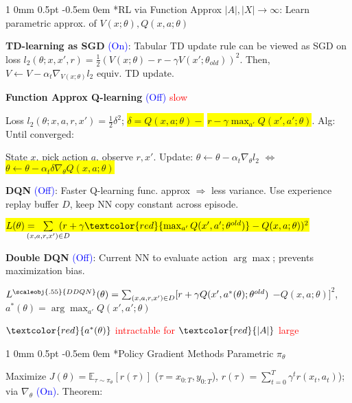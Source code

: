 \documentclass[11pt,landscape,a4paper,fleqn]{article}
\makeatletter
\newcommand*{\rsection}{%
	\@startsection{section}%
	{1}%
	{0mm}%
	{0.5pt}%
	{-0.5em \@plus 0em}
	{\color{myorange}\sffamily\small\bfseries}}
\newcommand{\mhl}[1]{\setlength{\fboxsep}{0pt}\colorbox{yellow}{#1}}
\makeatother
\begin{document}
\begin{multicols*}{4}

		\rsection*{RL via Function Approx} $|A|, |X| \rightarrow \infty$: Learn parametric approx. of  $V(x; \theta), Q(x,a;\theta)$

		\textbf{TD-learning as SGD} {\fontsize{9}{6}\selectfont \textcolor{blue}{(On)}}:
		Tabular TD update rule can be viewed as SGD on loss
	$l_2(\theta; x, x', r) = \frac{1}{2}(V(x;\theta) - r - \gamma V(x'; \theta_{old}))^2$. Then, $V \leftarrow V - \alpha_t \nabla_{V(x;\theta)} l_2$ equiv. TD update.

		\textbf{Function Approx Q-learning} {\fontsize{9}{6}\selectfont \textcolor{blue}{(Off)}} \textcolor{red}{slow}

		Loss $l_2(\theta;x,a,r,x') = \frac{1}{2}\delta^2$;
		\mhl{$\delta = Q(x,a;\theta) - $} \mhl{$ r - \gamma \max_{a'}Q(x',a';\theta)$}. Alg: Until converged:

		State $x$, pick action $a$, observe $r,x'$. Update: $\theta \leftarrow \theta - \alpha_t \nabla_\theta l_2$
	$\Leftrightarrow$ \mhl{$\theta \leftarrow \theta - \alpha_t \delta \nabla_\theta Q(x,a;\theta)$}

		\textbf{DQN} {\fontsize{9}{6}\selectfont \textcolor{blue}{(Off)}}:
		Faster Q-learning  func. approx $\Rightarrow$ less variance.
		Use experience replay buffer $D$, keep NN copy constant across episode.

		\mhl{$L(\theta) = \hspace*{-4mm} \sum\limits_{(x,a,r,x') \in D} \hspace*{-4mm} (r + \gamma \textcolor{red}{\max_{a'} Q(x', a'; \theta^{old})} - Q(x,a;\theta))^2$}

	\textbf{Double DQN} {\fontsize{9}{6}\selectfont \textcolor{blue}{(Off)}}:
	Current NN to evaluate
	action $\arg\max$; prevents maximization bias.

	$L^{{\scaleobj{.55}{ DDQN}}} (\theta) = \hspace*{0mm} \sum_{(x,a,r,x') \in D} \hspace*{0mm} [r + \gamma  Q(x', a^*(\theta); \theta^{old})$
			$ - Q(x,a;\theta) ]^2$,
	$a^*(\theta) = \arg\max_{a'} Q(x', a'; \theta)$

	\textcolor{red}{$\textcolor{red}{a^*(\theta)}$ intractable for $\textcolor{red}{|A|}$ large}


	\rsection*{Policy Gradient Methods} Parametric $\pi_\theta$

	Maximize $J(\theta) = \mathbb{E}_{\tau \sim \pi_\theta} [r(\tau)]$ ($\tau = x_{0:T}, y_{0:T}$), $r(\tau) = \sum_{t=0}^{T} \gamma^t r(x_t, a_t)$); via $\nabla_\theta$ {\fontsize{9}{6}\selectfont \textcolor{blue}{(On)}}. Theorem:


\end{multicols*}
\end{document}
